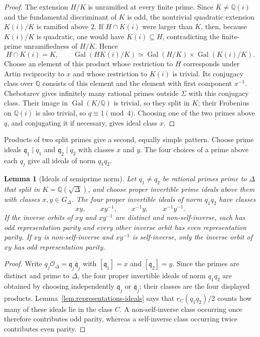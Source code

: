 \documentclass[10pt,a4paper]{amsart}
\newtheorem{lemma}[theorem]{Lemma}
\newcommand{\Q}{\mathbb{Q}}
\newcommand{\OO}{\mathcal{O}}
\newcommand{\Gal}{\operatorname{Gal}}
\begin{document}
\begin{proof}
The extension $H/K$ is unramified at every finite prime. Since $K\ne\Q(i)$ and the fundamental discriminant of $K$ is odd, the nontrivial quadratic extension $K(i)/K$ is ramified above $2$. If $H\cap K(i)$ were larger than $K$, then, because $K(i)/K$ is quadratic, one would have $K(i)\subseteq H$, contradicting the finite-prime unramifiedness of $H/K$. Hence
\[
  H\cap K(i)=K,
  \qquad
  \Gal(HK(i)/K)\simeq
  \Gal(H/K)\times\Gal(K(i)/K).
\]
Choose an element of this product whose restriction to $H$ corresponds under Artin reciprocity to $x$ and whose restriction to $K(i)$ is trivial. Its conjugacy class over $\Q$ consists of this element and the element with first component $x^{-1}$. Chebotarev gives infinitely many rational primes outside $\Sigma$ with this conjugacy class. Their image in $\Gal(K/\Q)$ is trivial, so they split in $K$; their Frobenius on $\Q(i)$ is also trivial, so $q\equiv1\pmod4$. Choosing one of the two primes above $q$, and conjugating it if necessary, gives ideal class $x$.
\end{proof}

Products of two split primes give a second, equally simple pattern.  Choose prime ideals $\mathfrak q_1\mid q_1$ and $\mathfrak q_2\mid q_2$ with classes $x$ and $y$.  The four choices of a prime above each $q_j$ give all ideals of norm $q_1q_2$.

\begin{lemma}[Ideals of semiprime norm]\label{lem:four-ideals}
Let $q_1\ne q_2$ be rational primes prime to $\Delta$ that split in $K=\Q(\sqrt\Delta)$, and choose proper invertible prime ideals above them with classes $x,y\in G_\Delta$. The four proper invertible ideals of norm $q_1q_2$ have classes
\[
  xy,\qquad xy^{-1},\qquad x^{-1}y,\qquad x^{-1}y^{-1}.
\]
If the inverse orbits of $xy$ and $xy^{-1}$ are distinct and non-self-inverse, each has odd representation parity and every other inverse orbit has even representation parity. If $xy$ is non-self-inverse and $xy^{-1}$ is self-inverse, only the inverse orbit of $xy$ has odd representation parity.
\end{lemma}

\begin{proof}
Write $q_j\OO_\Delta=\mathfrak q_j\overline{\mathfrak q}_j$ with $[\mathfrak q_1]=x$ and $[\mathfrak q_2]=y$. Since the primes are distinct and prime to $\Delta$, the four proper invertible ideals of norm $q_1q_2$ are obtained by choosing independently $\mathfrak q_j$ or $\overline{\mathfrak q}_j$; their classes are the four displayed products. Lemma~\ref{lem:representations-ideals} says that $r_C(q_1q_2)/2$ counts how many of these ideals lie in the class $C$. A non-self-inverse class occurring once therefore contributes odd parity, whereas a self-inverse class occurring twice contributes even parity.
\end{proof}
\end{document}
